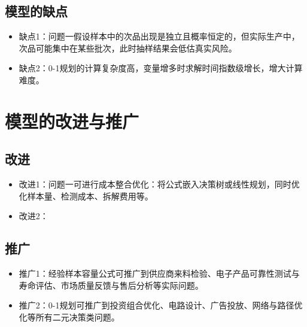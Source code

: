 \documentclass[withoutpreface,bwprint]{cumcmthesis}
\begin{document}
\subsection{模型的缺点}
\begin{itemize}[itemindent=2em]
\item 缺点1：问题一假设样本中的次品出现是独立且概率恒定的，但实际生产中，次品可能集中在某些批次，此时抽样结果会低估真实风险。

\item 缺点2：0-1规划的计算复杂度高，变量增多时求解时间指数级增长，增大计算难度。


\end{itemize}

\section{模型的改进与推广}

\subsection{改进}
\begin{itemize}[itemindent=2em]
   \item 改进1：问题一可进行成本整合优化：将公式嵌入决策树或线性规划，同时优化样本量、检测成本、拆解费用等。
   \item 改进2：
\end{itemize}


\subsection{推广}
\begin{itemize}[itemindent=2em]
    \item 推广1：经验样本容量公式可推广到供应商来料检验、电子产品可靠性测试与寿命评估、市场质量反馈与售后分析等实际问题。
   \item 推广2：0-1规划可推广到投资组合优化、电路设计、广告投放、网络与路径优化等所有二元决策类问题。
\end{itemize}
\newpage
\nocite{*}
\end{document}
